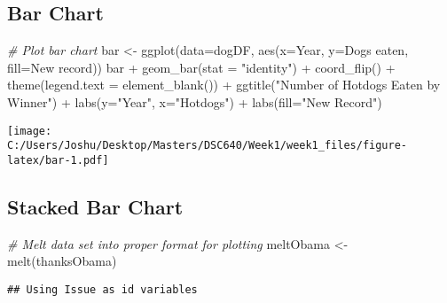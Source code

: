\documentclass[
]{article}
\newenvironment{Shaded}{\begin{snugshade}}{\end{snugshade}}
\newcommand{\AttributeTok}[1]{\textcolor[rgb]{0.77,0.63,0.00}{#1}}
\newcommand{\CommentTok}[1]{\textcolor[rgb]{0.56,0.35,0.01}{\textit{#1}}}
\newcommand{\FunctionTok}[1]{\textcolor[rgb]{0.00,0.00,0.00}{#1}}
\newcommand{\NormalTok}[1]{#1}
\newcommand{\OtherTok}[1]{\textcolor[rgb]{0.56,0.35,0.01}{#1}}
\newcommand{\SpecialCharTok}[1]{\textcolor[rgb]{0.00,0.00,0.00}{#1}}
\newcommand{\StringTok}[1]{\textcolor[rgb]{0.31,0.60,0.02}{#1}}
\begin{document}
\hypertarget{bar-chart}{%
\subsection{Bar Chart}\label{bar-chart}}

\begin{Shaded}
\begin{Highlighting}[]
\CommentTok{\# Plot bar chart}
\NormalTok{bar }\OtherTok{\textless{}{-}} \FunctionTok{ggplot}\NormalTok{(}\AttributeTok{data=}\NormalTok{dogDF, }\FunctionTok{aes}\NormalTok{(}\AttributeTok{x=}\NormalTok{Year, }\AttributeTok{y=}\StringTok{\textasciigrave{}}\AttributeTok{Dogs eaten}\StringTok{\textasciigrave{}}\NormalTok{, }\AttributeTok{fill=}\StringTok{\textasciigrave{}}\AttributeTok{New record}\StringTok{\textasciigrave{}}\NormalTok{))}
\NormalTok{bar }\SpecialCharTok{+} \FunctionTok{geom\_bar}\NormalTok{(}\AttributeTok{stat =} \StringTok{"identity"}\NormalTok{) }\SpecialCharTok{+} \FunctionTok{coord\_flip}\NormalTok{() }\SpecialCharTok{+} 
  \FunctionTok{theme}\NormalTok{(}\AttributeTok{legend.text =} \FunctionTok{element\_blank}\NormalTok{()) }\SpecialCharTok{+} 
  \FunctionTok{ggtitle}\NormalTok{(}\StringTok{"Number of Hotdogs Eaten by Winner"}\NormalTok{) }\SpecialCharTok{+} 
  \FunctionTok{labs}\NormalTok{(}\AttributeTok{y=}\StringTok{"Year"}\NormalTok{, }\AttributeTok{x=}\StringTok{"Hotdogs"}\NormalTok{) }\SpecialCharTok{+} 
  \FunctionTok{labs}\NormalTok{(}\AttributeTok{fill=}\StringTok{"New Record"}\NormalTok{)}
\end{Highlighting}
\end{Shaded}

\texttt{[image: C:/Users/Joshu/Desktop/Masters/DSC640/Week1/week1\_files/figure-latex/bar-1.pdf]}
\pagebreak

\hypertarget{stacked-bar-chart}{%
\subsection{Stacked Bar Chart}\label{stacked-bar-chart}}

\begin{Shaded}
\begin{Highlighting}[]
\CommentTok{\# Melt data set into proper format for plotting}
\NormalTok{meltObama }\OtherTok{\textless{}{-}} \FunctionTok{melt}\NormalTok{(thanksObama)}
\end{Highlighting}
\end{Shaded}

\begin{verbatim}
## Using Issue as id variables
\end{verbatim}
\end{document}
